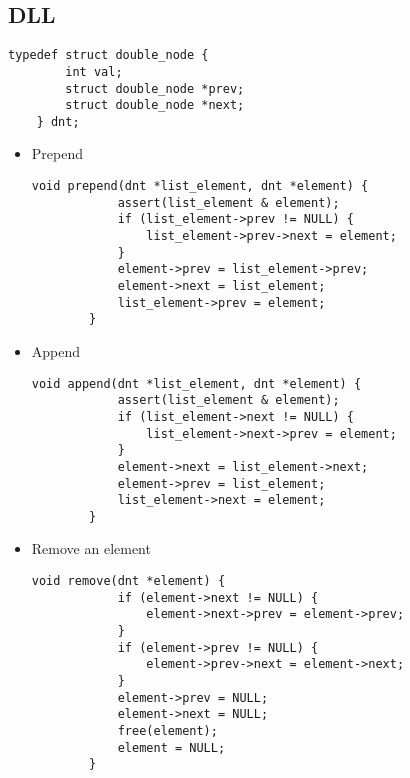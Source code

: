 \documentclass{article}
\begin{document}
\subsection{DLL}
\begin{lstlisting}[style=CStyle]
    typedef struct double_node {
        int val;
        struct double_node *prev;
        struct double_node *next;
    } dnt;
\end{lstlisting}
\begin{itemize}
    \item Prepend
    \begin{lstlisting}[style=CStyle]
        void prepend(dnt *list_element, dnt *element) {
            assert(list_element & element);
            if (list_element->prev != NULL) {
                list_element->prev->next = element;
            }
            element->prev = list_element->prev;
            element->next = list_element;
            list_element->prev = element;
        }
    \end{lstlisting}
    \item Append
    \begin{lstlisting}[style=CStyle]
        void append(dnt *list_element, dnt *element) {
            assert(list_element & element);
            if (list_element->next != NULL) {
                list_element->next->prev = element;
            }
            element->next = list_element->next;
            element->prev = list_element;
            list_element->next = element;
        }
    \end{lstlisting}
    \item Remove an element
    \begin{lstlisting}[style=CStyle]
        void remove(dnt *element) {
            if (element->next != NULL) {
                element->next->prev = element->prev;
            }
            if (element->prev != NULL) {
                element->prev->next = element->next;
            }
            element->prev = NULL;
            element->next = NULL;
            free(element);
            element = NULL;
        }
    \end{lstlisting}

\end{itemize}
\end{document}
